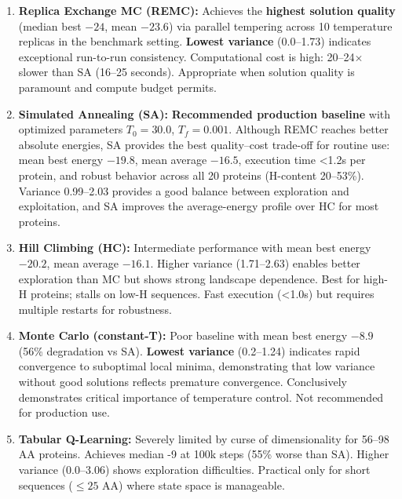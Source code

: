 \begin{enumerate}
    \item \textbf{Replica Exchange MC (REMC):} Achieves the \textbf{highest solution quality} (median best $-24$, mean $-23.6$) via parallel tempering across 10 temperature replicas in the benchmark setting. \textbf{Lowest variance} (0.0--1.73) indicates exceptional run-to-run consistency. Computational cost is high: 20--24$\times$ slower than SA (16--25 seconds). Appropriate when solution quality is paramount and compute budget permits.
    
    \item \textbf{Simulated Annealing (SA):} \textbf{Recommended production baseline} with optimized parameters $T_0 = 30.0$, $T_f = 0.001$. Although REMC reaches better absolute energies, SA provides the best quality--cost trade-off for routine use: mean best energy $-19.8$, mean average $-16.5$, execution time <1.2s per protein, and robust behavior across all 20 proteins (H-content 20--53\%). Variance 0.99--2.03 provides a good balance between exploration and exploitation, and SA improves the average-energy profile over HC for most proteins.
    
    \item \textbf{Hill Climbing (HC):} Intermediate performance with mean best energy $-20.2$, mean average $-16.1$. Higher variance (1.71--2.63) enables better exploration than MC but shows strong landscape dependence. Best for high-H proteins; stalls on low-H sequences. Fast execution (<1.0s) but requires multiple restarts for robustness.
    
    \item \textbf{Monte Carlo (constant-T):} Poor baseline with mean best energy $-8.9$ (56\% degradation vs SA). \textbf{Lowest variance} (0.2--1.24) indicates rapid convergence to suboptimal local minima, demonstrating that low variance without good solutions reflects premature convergence. Conclusively demonstrates critical importance of temperature control. Not recommended for production use.
    
    \item \textbf{Tabular Q-Learning:} Severely limited by curse of dimensionality for 56--98 AA proteins. Achieves median -9 at 100k steps (55\% worse than SA). Higher variance (0.0--3.06) shows exploration difficulties. Practical only for short sequences ($\leq 25$ AA) where state space is manageable.
    

\end{enumerate}

